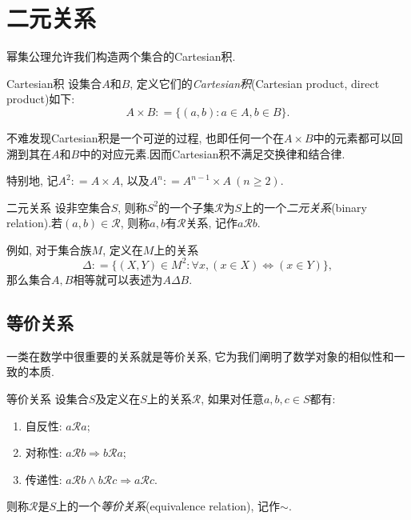 \newpage
\section{二元关系}

幂集公理允许我们构造两个集合的Cartesian积.

\begin{definition}{Cartesian积}
	设集合$A$和$B$, 定义它们的\textit{Cartesian积}(Cartesian product,  direct product)如下: $$A \times B : = \{ (a, b): a \in A, b \in B \}.$$
\end{definition}
\begin{remark}
	不难发现Cartesian积是一个可逆的过程, 也即任何一个在$A \times B$中的元素都可以回溯到其在$A$和$B$中的对应元素.因而Cartesian积不满足交换律和结合律.
\end{remark}
\begin{remark}
	特别地, 记$A^2: =A \times A$, 以及$A^n : = A^{n-1} \times A~(n \geq 2)$.
\end{remark}

\begin{definition}{二元关系}
	设非空集合$S$, 则称$S^2$的一个子集$\mathcal{R}$为$S$上的一个\textit{二元关系}(binary relation).若$(a, b) \in \mathcal{R}$, 则称$a, b$有$\mathcal{R}$关系, 记作$a\mathcal{R}b$.
\end{definition}

例如, 对于集合族$M$, 定义在$M$上的关系$$\Delta : = \{ (X, Y) \in M^2 :  \forall x, (x \in X) \Leftrightarrow (x \in Y) \}, $$
那么集合$A, B$相等就可以表述为$A \Delta B$.

\subsection{等价关系}

一类在数学中很重要的关系就是等价关系, 它为我们阐明了数学对象的相似性和一致的本质.

\begin{definition}{等价关系}
	设集合$S$及定义在$S$上的关系$\mathcal{R}$, 如果对任意$a, b, c \in S$都有: 
	\begin{enumerate}
		\item 自反性: $a\mathcal{R} a$; 
		\item 对称性: $a\mathcal{R} b \Rightarrow b\mathcal{R} a$; 
		\item 传递性: $a\mathcal{R} b \wedge b\mathcal{R} c \Rightarrow a\mathcal{R} c$.
	\end{enumerate}
	则称$\mathcal{R}$是$S$上的一个\textit{等价关系}(equivalence relation), 记作$\sim$.
\end{definition}

